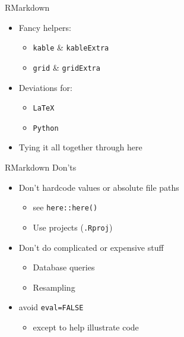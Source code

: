 \documentclass[
  ignorenonframetext,
]{beamer}
\providecommand{\tightlist}{%
  \setlength{\itemsep}{0pt}\setlength{\parskip}{0pt}}
\begin{document}
\begin{frame}[fragile]{RMarkdown}
\protect\hypertarget{rmarkdown-3}{}

\begin{itemize}[<+->]
\tightlist
\item
  Fancy helpers:

  \begin{itemize}[<+->]
  \tightlist
  \item
    \texttt{kable} \& \texttt{kableExtra}
  \item
    \texttt{grid} \& \texttt{gridExtra}
  \end{itemize}
\item
  Deviations for:

  \begin{itemize}[<+->]
  \tightlist
  \item
    \texttt{LaTeX}
  \item
    \texttt{Python}
  \end{itemize}
\item
  Tying it all together through here
\end{itemize}

\end{frame}

\begin{frame}[fragile]{RMarkdown Don'ts}
\protect\hypertarget{rmarkdown-donts}{}

\begin{itemize}[<+->]
\tightlist
\item
  Don't hardcode values or absolute file paths

  \begin{itemize}[<+->]
  \tightlist
  \item
    see \texttt{here::here()}
  \item
    Use projects (\texttt{.Rproj})
  \end{itemize}
\item
  Don't do complicated or expensive stuff

  \begin{itemize}[<+->]
  \tightlist
  \item
    Database queries
  \item
    Resampling
  \end{itemize}
\item
  avoid \texttt{eval=FALSE}

  \begin{itemize}[<+->]
  \tightlist
  \item
    except to help illustrate code
  \end{itemize}
\end{itemize}

\end{frame}
\end{document}
